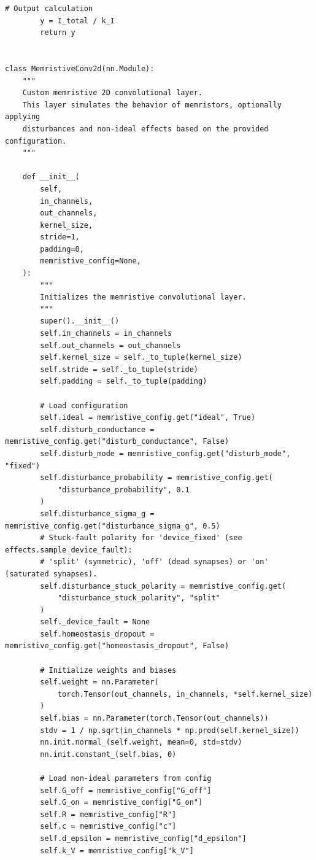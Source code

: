\begin{lstlisting}[caption={mnn\_torch/layers.py},label={lst:mnn-src-layers}]
        # Output calculation
        y = I_total / k_I
        return y


class MemristiveConv2d(nn.Module):
    """
    Custom memristive 2D convolutional layer.
    This layer simulates the behavior of memristors, optionally applying
    disturbances and non-ideal effects based on the provided configuration.
    """

    def __init__(
        self,
        in_channels,
        out_channels,
        kernel_size,
        stride=1,
        padding=0,
        memristive_config=None,
    ):
        """
        Initializes the memristive convolutional layer.
        """
        super().__init__()
        self.in_channels = in_channels
        self.out_channels = out_channels
        self.kernel_size = self._to_tuple(kernel_size)
        self.stride = self._to_tuple(stride)
        self.padding = self._to_tuple(padding)

        # Load configuration
        self.ideal = memristive_config.get("ideal", True)
        self.disturb_conductance = memristive_config.get("disturb_conductance", False)
        self.disturb_mode = memristive_config.get("disturb_mode", "fixed")
        self.disturbance_probability = memristive_config.get(
            "disturbance_probability", 0.1
        )
        self.disturbance_sigma_g = memristive_config.get("disturbance_sigma_g", 0.5)
        # Stuck-fault polarity for 'device_fixed' (see effects.sample_device_fault):
        # 'split' (symmetric), 'off' (dead synapses) or 'on' (saturated synapses).
        self.disturbance_stuck_polarity = memristive_config.get(
            "disturbance_stuck_polarity", "split"
        )
        self._device_fault = None
        self.homeostasis_dropout = memristive_config.get("homeostasis_dropout", False)

        # Initialize weights and biases
        self.weight = nn.Parameter(
            torch.Tensor(out_channels, in_channels, *self.kernel_size)
        )
        self.bias = nn.Parameter(torch.Tensor(out_channels))
        stdv = 1 / np.sqrt(in_channels * np.prod(self.kernel_size))
        nn.init.normal_(self.weight, mean=0, std=stdv)
        nn.init.constant_(self.bias, 0)

        # Load non-ideal parameters from config
        self.G_off = memristive_config["G_off"]
        self.G_on = memristive_config["G_on"]
        self.R = memristive_config["R"]
        self.c = memristive_config["c"]
        self.d_epsilon = memristive_config["d_epsilon"]
        self.k_V = memristive_config["k_V"]


\end{lstlisting}
